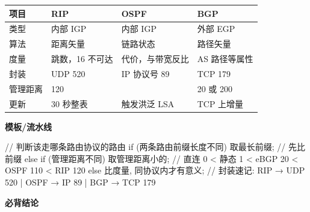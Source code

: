 \documentclass[10pt,a4paper]{ctexart}
\begin{document}
\begin{center}\small
\begin{tabularx}{\linewidth}{@{}ll>{\raggedright\arraybackslash}Xl@{}}
\toprule
项目 & RIP & OSPF & BGP \\
\midrule
类型 & 内部 IGP & 内部 IGP & 外部 EGP \\
算法 & 距离矢量 & 链路状态 & 路径矢量 \\
度量 & 跳数，16 不可达 & 代价，与带宽反比 & AS 路径等属性 \\
封装 & UDP 520 & IP 协议号 89 & TCP 179 \\
管理距离 & 120 & 110 & 20 或 200 \\
更新 & 30 秒整表 & 触发洪泛 LSA & TCP 上增量 \\
\bottomrule
\end{tabularx}
\end{center}

\textbf{模板/流水线}

\begin{codebox}
// 判断该走哪条路由协议的路由
if (两条路由前缀长度不同)  取最长前缀;          // 先比前缀
else if (管理距离不同)     取管理距离小的;      // 直连 0 < 静态 1 < eBGP 20 < OSPF 110 < RIP 120
else                       比度量, 同协议内才有意义;
// 封装速记: RIP → UDP 520 | OSPF → IP 89 | BGP → TCP 179
\end{codebox}




\textbf{必背结论}
\end{document}
